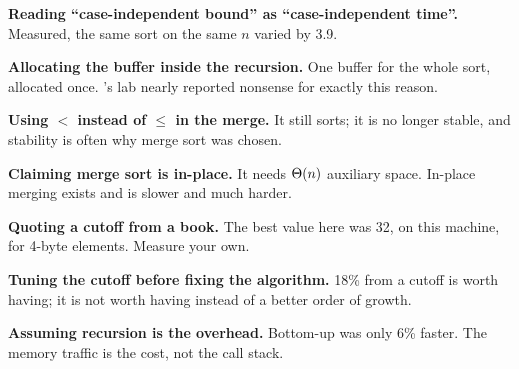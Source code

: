 \begin{pitfall}
\begin{tight}
  \item \textbf{Reading ``case-independent bound'' as ``case-independent
        time''.} Measured, the same sort on the same $n$ varied by 3.9.
  \item \textbf{Allocating the buffer inside the recursion.} One buffer for the
        whole sort, allocated once. 's lab nearly reported
        nonsense for exactly this reason.
  \item \textbf{Using $<$ instead of $\le$ in the merge.} It still sorts; it is
        no longer stable, and stability is often why merge sort was chosen.
  \item \textbf{Claiming merge sort is in-place.} It needs $\Theta(n)$
        auxiliary space. In-place merging exists and is slower and much harder.
  \item \textbf{Quoting a cutoff from a book.} The best value here was 32, on
        this machine, for 4-byte elements. Measure your own.
  \item \textbf{Tuning the cutoff before fixing the algorithm.} 18\% from a
        cutoff is worth having; it is not worth having instead of a better
        order of growth.
  \item \textbf{Assuming recursion is the overhead.} Bottom-up was only 6\%
        faster. The memory traffic is the cost, not the call stack.
\end{tight}
\end{pitfall}

